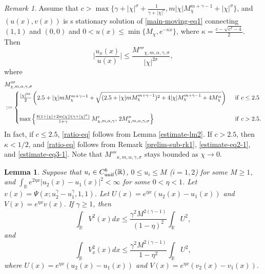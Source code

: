 \documentclass[11pt]{article} %
\newtheorem{lemma}{Lemma}[section]
\theoremstyle{remark}
\newtheorem{remark}{Remark}[section]
\theoremstyle{remark}
\numberwithin{equation}{section}
\numberwithin{figure}{section}
\numberwithin{table}{section}
\newcommand\RR{\ensuremath{\mathbb{R}}}
\begin{document}
\begin{remark}
\label{estimate-rk2}
 Assume that
 $c>\max\big\{\gamma+|\chi|^\sigma +\frac{1}{\gamma+|\chi|^\sigma }, m|\chi| M^{m+\gamma-1}_\chi+|\chi|^\sigma \big\}$, 
and   $(u(x),v(x))$ is  s stationary  solution of \eqref{main-moving-eq1}  connecting $(1,1)$ and $(0,0)$  and $0<u(x)\le \min\{M_\chi, e^{-\kappa x}\}$, where $\kappa=\frac{c-\sqrt{c^2-4}}{2}$. Then
\begin{equation}
\label{ratio-eq}
\big|\frac{u_x(x)}{u(x)}\big|\le  \frac{M'''_{\chi,m,\alpha,\gamma,\sigma}}{|\chi|^{2\sigma}},
\end{equation}
where
\begin{align*}
&M'''_{\chi,m,\alpha,\gamma,\sigma}\\
&:= \begin{cases}
\frac{|\chi|^{2\sigma}}{2}\left( 2.5+|\chi| m M_{\chi}^{m+\gamma-1}+\sqrt{ (2.5+|\chi| m M_{\chi}^{m+\gamma-1})^2 +4|\chi| M_{\chi}^{m+\gamma-1}+4M_{\chi}^\alpha}\right)\,\,\, & {\rm if}\,\, c\le 2.5\cr\cr
\max\Big\{  \frac{8 (1+|\chi|+2m|\chi|)(\gamma+|\chi|^\sigma) } {1+\gamma} \, M'_{\chi, m,\alpha,\gamma},\,  2M''_{\chi,m,\alpha,\gamma,\sigma}\Big\}\quad &{\rm if}\,\, c>2.5.
\end{cases}
\end{align*}
In fact,  if  $c\le 2.5$, \eqref{ratio-eq}   follows from 
Lemma \ref{estimate-lm2}. If $c>2.5$, then  $ \kappa<1/2$, and \eqref{ratio-eq}  follows from  Remark \ref{prelim-sub-rk1},   \eqref{estimate-eq2-1}, and \eqref{estimate-eq3-1}.
Note that $M'''_{\kappa,m,\alpha,\gamma,\sigma}$ stays bounded as $\chi\to 0$.
\end{remark}


\begin{lemma}
\label{estimate-lm3}
Suppose that $u_i\in C_{\rm unif}^b(\RR)$, $0\le u_i\le M$ ($i=1,2$) for some $M\ge 1$,  and $\int_{\RR} e^{2\eta x}
|u_2(x)-u_1(x)|^2<\infty$
for some $0<\eta<1$.
Let $v(x)=\Psi(x;u_2^\gamma-u_1^\gamma ,1,1)$. Let $U(x)=e^{\eta x} (u_2(x)-u_1(x))$ and $V(x)=e^{\eta x} v(x)$. If $\gamma \ge 1$, 
then
\begin{equation}
\label{estimate-eq4}
\int_{\RR }V^2(x)  dx\le \frac{\gamma^2 M^{2(\gamma-1)} }{(1-\eta)^2}\int_{\RR} U^2,
\end{equation}
and
\begin{equation}
\label{estimate-eq5}
\int_{\RR} V_x^2(x)dx\le \frac{\gamma^2 M^{2(\gamma-1)}}{1-\eta^2}\int_{\RR} U^2,
\end{equation}
where $U(x)=e^{\eta x}(u_2(x)-u_1(x))$ and $V(x)=e^{\eta x}(v_2(x)-v_1(x))$.
\end{lemma}
\end{document}

